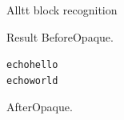 \documentclass[aspectratio=169]{beamer}
\author{}
\date{}
\begin{document}
\begin{frame}[fragile]{Alltt block recognition}
\begin{exampleblock}{Result}
BeforeOpaque.
\begin{alltt}
  echo hello
  echo world
\end{alltt}
AfterOpaque.
\end{exampleblock}
\end{frame}
\end{document}

